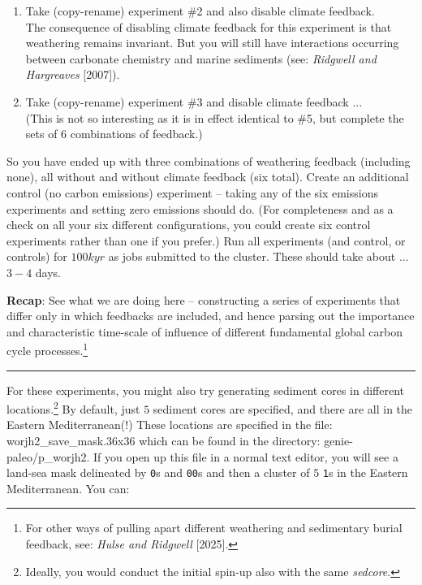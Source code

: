 \begin{enumerate}[noitemsep]
\vspace{1mm}
\item Take (copy-rename) experiment \#2 and also disable climate feedback.
\\The consequence of disabling climate feedback for this experiment is that weathering remains invariant. But you will still have interactions occurring between carbonate chemistry and marine sediments (see: \textit{Ridgwell and Hargreaves} [2007]).

\vspace{1mm}
\item Take (copy-rename) experiment \#3 and disable climate feedback ...
\\(This is not so interesting as it is in effect identical to \#5, but complete the sets of 6 combinations of feedback.)

\end{enumerate}

\newpage

\noindent So you have ended up with three combinations of weathering feedback (including none), all without and without climate feedback (six total). Create an additional control (no carbon emissions) experiment -- taking any of the six emissions experiments and setting zero emissions should do. (For completeness and as a check on all your six different configurations, you could create six control experiments rather than one if you prefer.) Run all experiments (and control, or controls) for $100 kyr$ as jobs submitted to the cluster. These should take about ... $3-4$ days.

\vspace{1mm}
\noindent \textbf{Recap}: See what we are doing here -- constructing a series of experiments that differ only in which feedbacks are included, and hence parsing out the importance and characteristic time-scale of influence of different fundamental global carbon cycle processes.\footnote{For other ways of pulling apart different weathering and sedimentary burial feedback, see: \textit{Hulse and Ridgwell} [2025].}

\vspace{1mm}\noindent\rule{4cm}{0.1mm}\vspace{2mm}

\noindent For these experiments, you might also try generating sediment cores in different locations.\footnote{Ideally, you would conduct the initial spin-up also with the same \textit{sedcore}.}  By default, just $5$ sediment cores are specified, and there are all in the Eastern Mediterranean(!) These locations are specified in the file: \textsf{\footnotesize worjh2\_save\_mask.36x36} which can be found in the directory: \textsf{\footnotesize genie-paleo/p\_worjh2}. If you open up this file in a normal text editor, you will see a land-sea mask delineated by \texttt{0}s and \texttt{00}s and then a cluster of $5$ \texttt{1}s in the Eastern Mediterranean. You can:

